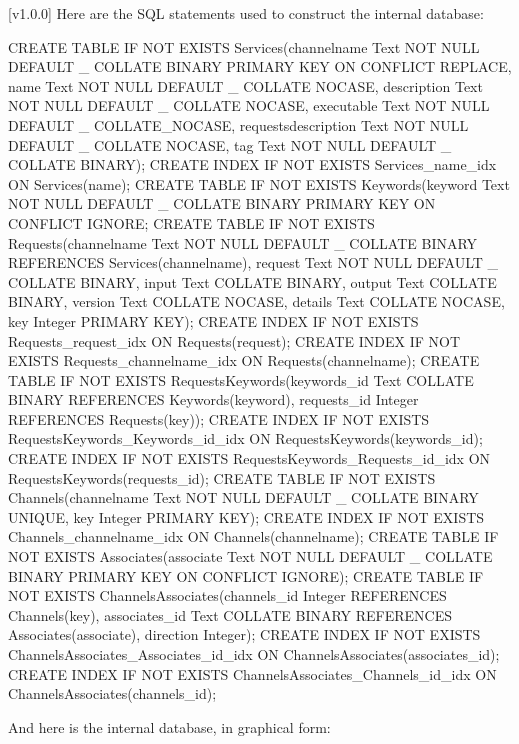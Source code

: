 [v1.0.0]
%
Here are the SQL statements used to construct the internal database:
\outputBegin{}
\begin{listing}[5]{1}
CREATE TABLE IF NOT EXISTS Services(channelname Text NOT NULL DEFAULT _
           COLLATE BINARY PRIMARY KEY ON CONFLICT REPLACE,
       name Text NOT NULL DEFAULT _ COLLATE NOCASE,
       description Text NOT NULL DEFAULT _ COLLATE NOCASE,
       executable Text NOT NULL DEFAULT _ COLLATE_NOCASE,
       requestsdescription Text NOT NULL DEFAULT _ COLLATE NOCASE,
       tag Text NOT NULL DEFAULT _  COLLATE BINARY);
CREATE INDEX IF NOT EXISTS Services_name_idx ON Services(name);
CREATE TABLE IF NOT EXISTS Keywords(keyword Text NOT NULL DEFAULT _
           COLLATE BINARY PRIMARY KEY ON CONFLICT IGNORE;
CREATE TABLE IF NOT EXISTS Requests(channelname Text NOT NULL DEFAULT _
           COLLATE BINARY REFERENCES Services(channelname),
       request Text NOT NULL DEFAULT _ COLLATE BINARY,
       input Text COLLATE BINARY,
       output Text COLLATE BINARY,
       version Text COLLATE NOCASE,
       details Text COLLATE NOCASE,
       key Integer PRIMARY KEY);
CREATE INDEX IF NOT EXISTS Requests_request_idx ON Requests(request);
CREATE INDEX IF NOT EXISTS Requests_channelname_idx ON Requests(channelname);
CREATE TABLE IF NOT EXISTS RequestsKeywords(keywords_id Text COLLATE BINARY
           REFERENCES Keywords(keyword),
       requests_id Integer REFERENCES Requests(key));
CREATE INDEX IF NOT EXISTS RequestsKeywords_Keywords_id_idx ON
       RequestsKeywords(keywords_id);
CREATE INDEX IF NOT EXISTS RequestsKeywords_Requests_id_idx ON
       RequestsKeywords(requests_id);
CREATE TABLE IF NOT EXISTS Channels(channelname Text NOT NULL DEFAULT _
           COLLATE BINARY UNIQUE,
       key Integer PRIMARY KEY);
CREATE INDEX IF NOT EXISTS Channels_channelname_idx ON Channels(channelname);
CREATE TABLE IF NOT EXISTS Associates(associate Text NOT NULL DEFAULT _
           COLLATE BINARY PRIMARY KEY ON CONFLICT IGNORE);
CREATE TABLE IF NOT EXISTS ChannelsAssociates(channels_id Integer
           REFERENCES Channels(key),
       associates_id Text COLLATE BINARY REFERENCES Associates(associate),
       direction Integer);
CREATE INDEX IF NOT EXISTS ChannelsAssociates_Associates_id_idx ON
       ChannelsAssociates(associates_id);
CREATE INDEX IF NOT EXISTS ChannelsAssociates_Channels_id_idx ON
       ChannelsAssociates(channels_id);
\end{listing}
\outputEnd{}
\condPage{}
And here is the internal database, in graphical form:\\
\appendixEnd{}
